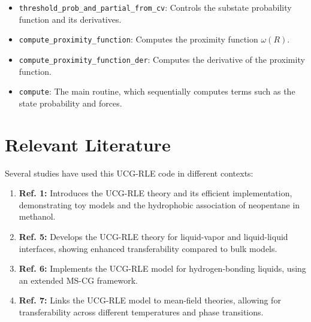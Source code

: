 \documentclass{article}
\begin{document}
\begin{itemize}
    \item \texttt{threshold\_prob\_and\_partial\_from\_cv}: Controls the substate probability function and its derivatives.
    \item \texttt{compute\_proximity\_function}: Computes the proximity function \( \omega(R) \).
    \item \texttt{compute\_proximity\_function\_der}: Computes the derivative of the proximity function.
    \item \texttt{compute}: The main routine, which sequentially computes terms such as the state probability and forces.
\end{itemize}

\section{Relevant Literature}
Several studies have used this UCG-RLE code in different contexts:
\begin{enumerate}
    \item \textbf{Ref. 1:} Introduces the UCG-RLE theory and its efficient implementation, demonstrating toy models and the hydrophobic association of neopentane in methanol.
    \item \textbf{Ref. 5:} Develops the UCG-RLE theory for liquid-vapor and liquid-liquid interfaces, showing enhanced transferability compared to bulk models.
    \item \textbf{Ref. 6:} Implements the UCG-RLE model for hydrogen-bonding liquids, using an extended MS-CG framework.
    \item \textbf{Ref. 7:} Links the UCG-RLE model to mean-field theories, allowing for transferability across different temperatures and phase transitions.
\end{enumerate}
\end{document}
